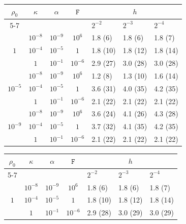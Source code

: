 \documentclass[11pt, reqno, a4paper, twoside]{article}
\newcommand{\rF}{\mathtt{F}}
\numberwithin{equation}{section}
\numberwithin{remark}{section}
\numberwithin{figure}{section}
\numberwithin{table}{section}
\begin{document}
\begin{table}[t]
\centering
\footnotesize
\setlength{\tabcolsep}{5pt}
\renewcommand{\arraystretch}{1.15}

{
\begin{minipage}{0.48\textwidth}
\centering
\begin{tabular}{|c |c|c| c|lll|}
\hline
$\rho_0$ & $\kappa$ & $\alpha$ & $\rF$ & \multicolumn{3}{c|}{$h$} \\
\cline{5-7}
 & & & & $2^{-2}$ & $2^{-3}$ & $2^{-4}$ \\
\hline

\multirow{3}{*}{$1$}
& $10^{-8}$ & $10^{-9}$ & $10^{6}$ & 1.8 (6) & 1.8 (6)& 1.8 (7) \\
& $10^{-4}$ & $10^{-5}$ & $1$ & 1.8 (10)& 1.8 (12) & 1.8 (14)\\
& $1$ & $10^{-1}$ & $10^{-6}$ &2.9 (27) &3.0 (28) &3.0 (28) \\
\hline

\multirow{3}{*}{$10^{-5}$}
& $10^{-8}$ & $10^{-9}$ & $10^{6}$ & 1.2 (8) &1.3 (10) &1.6 (14) \\
& $10^{-4}$ & $10^{-5}$ & $1$ &3.6 (31) &4.0 (35) &4.2 (35) \\
& $1$ & $10^{-1}$ & $10^{-6}$ &2.1 (22) &2.1 (22) &2.1 (22) \\
\hline

\multirow{3}{*}{$10^{-9}$}
& $10^{-8}$ & $10^{-9}$ & $10^{6}$ & 3.6 (24)&4.1 (26) &4.3 (28) \\
& $10^{-4}$ & $10^{-5}$ & $1$ &3.7 (32) &4.1 (35) &4.2 (35) \\
& $1$ & $10^{-1}$ & $10^{-6}$ &2.1 (22) &2.1 (22) &2.1 (22) \\
\hline
\end{tabular}
\end{minipage}}
\hfill
{\begin{minipage}{0.48\textwidth}
\centering
\begin{tabular}{|c |c|c| c|lll|}
\hline
$\rho_0$ & $\kappa$ & $\alpha$ & $\rF$ & \multicolumn{3}{c|}{$h$} \\
\cline{5-7}
 & & & & $2^{-2}$ & $2^{-3}$ & $2^{-4}$ \\
\hline

\multirow{3}{*}{$1$}
& $10^{-8}$ & $10^{-9}$ & $10^{6}$ & 1.8 (6) & 1.8 (6)& 1.8 (7) \\
& $10^{-4}$ & $10^{-5}$ & $1$ & 1.8 (10)& 1.8 (12) & 1.8 (14)\\
& $1$ & $10^{-1}$ & $10^{-6}$ &2.9 (28) &3.0 (29) &3.0 (29) \\
\hline


\end{tabular}
\end{minipage}}
\end{table}
\end{document}
